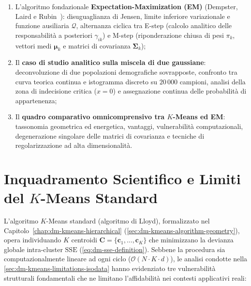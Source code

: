 \begin{enumerate}[noitemsep]
    \item L'algoritmo fondazionale \textbf{Expectation-Maximization (EM)} (Dempster, Laird e Rubin~\cite{dempster1977}): disuguaglianza di Jensen, limite inferiore variazionale e funzione ausiliaria $\mathcal{Q}$, alternanza ciclica tra E-step (calcolo analitico delle responsabilità a posteriori $\gamma_{ik}$) e M-step (riponderazione chiusa di pesi $\pi_k$, vettori medi $\boldsymbol{\mu}_k$ e matrici di covarianza $\boldsymbol{\Sigma}_k$);
    \item Il \textbf{caso di studio analitico sulla miscela di due gaussiane}: deconvoluzione di due popolazioni demografiche sovrapposte, confronto tra curva teorica continua e istogramma discreto su $20\,000$ campioni, analisi della zona di indecisione critica ($x=0$) e assegnazione continua delle probabilità di appartenenza;
    \item Il \textbf{quadro comparativo omnicomprensivo tra $K$-Means ed EM}: tassonomia geometrica ed energetica, vantaggi, vulnerabilità computazionali, degenerazione singolare delle matrici di covarianza e tecniche di regolarizzazione ad alta dimensionalità.
\end{enumerate}

\section{Inquadramento Scientifico e Limiti del \texorpdfstring{$K$}{K}-Means Standard}
\label{sec:dm-kmeans-limits}

L'algoritmo $K$-Means standard (algoritmo di Lloyd), formalizzato nel Capitolo~\ref{chap:dm-kmeans-hierarchical} (\autoref{sec:dm-kmeans-algorithm-geometry}), opera individuando $K$ centroidi $\mathbf{C} = \{\mathbf{c}_1, \dots, \mathbf{c}_K\}$ che minimizzano la devianza globale intra-cluster $\mathrm{SSE}$ (\autoref{eq:dm-sse-definition}). Sebbene la procedura sia computazionalmente lineare ad ogni ciclo ($\mathcal{O}(N \cdot K \cdot d)$), le analisi condotte nella \autoref{sec:dm-kmeans-limitations-isodata} hanno evidenziato tre vulnerabilità strutturali fondamentali che ne limitano l'affidabilità nei contesti applicativi reali:

